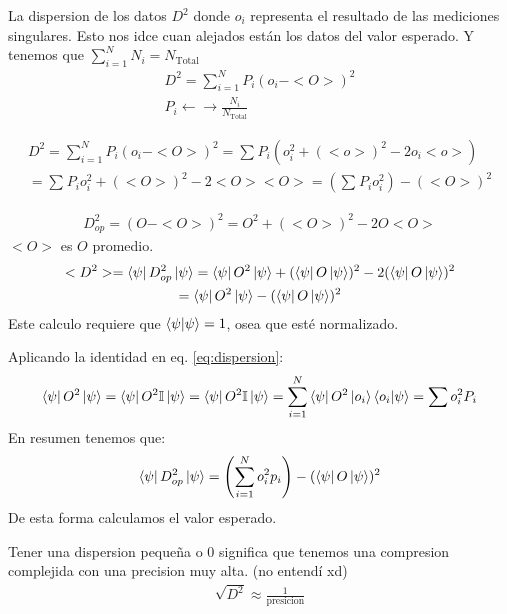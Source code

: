 \documentclass{article}
\newcommand{\caja}[3]{%
  \begin{tcolorbox}[colback=#1!5!white,colframe=#1!25!black,title=#2]
    #3
  \end{tcolorbox}%
}
\begin{document}
\caja{green}{Analisis datos }{
  La dispersion de los datos $D ^2$ donde $ o_i  $ representa el resultado de las mediciones singulares. Esto nos idce cuan alejados están los datos del valor esperado. Y tenemos que $ \sum_{i=1 }^{N } N_i = N_{\text{Total}} $
  \begin{gather}
    D ^ {2 } = \sum_{i=1 }^{N } P_i (o_i - <O> )^2\\
    P_i \leftarrow \rightarrow \frac{N_i }{N_{\text{Total}}}
    \label{eq:probabilidad_datos}
  \end{gather}
}
\begin{gather}
    D ^ {2 } = \sum_{i=1 }^{N } P_i (o_i - <O> )^2 = \sum_{}^{} P_i \left(o_i ^ {2 } + (<o>)^ {2 } - 2o_i<o>\right)\\
    = \sum_{}^{} P_i o_i ^2 + (<O>)^2 - 2 <O><O> = \left(\sum_{}^{}P_i o_i ^2\right)- (<O>)^2
\end{gather}
\caja{green}{Dispersion }{
  \begin{gather}
    D _{op } ^ {2 } = (O-<O> )^2 = O ^2 + (<O>)^2 - 2 O<O>
  \end{gather}
  $ <O> $ es $ O  $ promedio.
  \begin{gather}
    <D ^2> = \bra{\psi}D _{op } ^ {2 }\ket{\psi} = \bra{\psi}O ^2\ket{\psi}  + (\bra{\psi}O \ket{\psi} )^2-2(\bra{\psi}O \ket{\psi} )^2 \label{eq:dispersion}\\
    = \bra{\psi}O ^2 \ket{\psi}-(\bra{\psi}O \ket{\psi} )^2 
  \end{gather}
  Este calculo requiere que $ \bra{\psi}\ket{\psi}  = 1$, osea que esté normalizado. 

  Aplicando la identidad en eq. \ref{eq:dispersion}: 
  \begin{gather}
    \bra{\psi}O ^2\ket{\psi}  = \bra{\psi}O ^2 \mathbb{I }\ket{\psi} = \bra{\psi}O ^2 \mathbb{I }\ket{\psi} = \sum_{i=1 }^{N }\bra{\psi}O ^2 \ket{o_i }\bra{o_i }\ket{\psi} = \sum_{}^{}o_i ^2 P_i
  \end{gather}
  En resumen tenemos que:
  \begin{gather}
    \bra{\psi}D _{op}  ^2\ket{\psi} = \left(\sum_{i=1 }^{N } o_i ^2 p_i\right) - (\bra{\psi}O \ket{\psi} )^2  
  \end{gather}
  De esta forma calculamos el valor esperado.
}
Tener una dispersion pequeña o 0 significa que tenemos una compresion complejida con una precision muy alta. (no entendí xd)
\begin{gather}
   \sqrt{D ^2} \approx \frac{1}{\text{presicion}} 
\end{gather}
\end{document}

